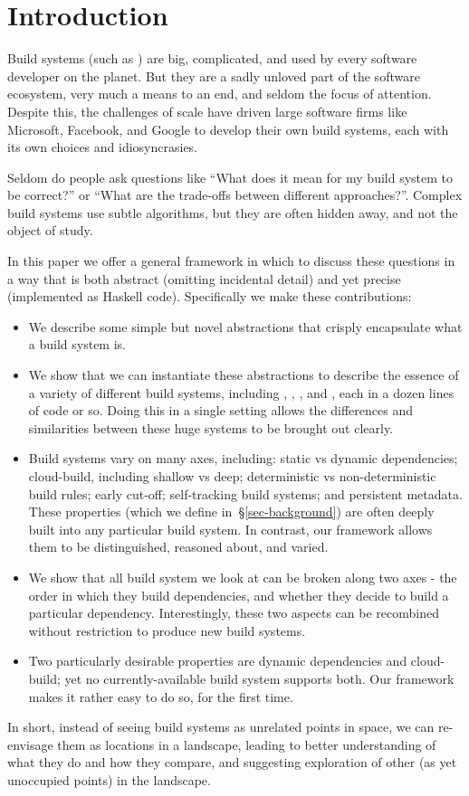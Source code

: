 \section{Introduction}\label{sec-intro}

Build systems (such as \Make) are big, complicated, and used by every
software developer on the planet.  But they are a sadly unloved part
of the software ecosystem, very much a means to an end, and seldom the
focus of attention.  Despite this, the challenges of scale have driven
large software firms like Microsoft, Facebook, and Google to develop
their own build systems, each with its own choices and idiosyncrasies.

Seldom do people ask questions like ``What does it mean for my build
system to be correct?'' or ``What are the trade-offs between different
approaches?''.  Complex build systems use subtle algorithms, but they
are often hidden away, and not the object of study.

In this paper we offer a general framework in which to discuss these
questions in a way that is both abstract (omitting incidental detail)
and yet precise (implemented as Haskell code).  Specifically we make
these contributions:
\begin{itemize}
\item We describe some simple but novel abstractions that
crisply encapsulate what a build system is.
\item We show that we can instantiate
these abstractions to describe the essence of a variety of different
build systems, including \Make, \Shake, \Bazel, and \Excel, each in
a dozen lines of code or so.
Doing this in a single setting allows
the differences and similarities between these huge systems to be
brought out clearly.
\item Build systems vary on many axes,
including: static vs dynamic dependencies; cloud-build, including
shallow vs deep; deterministic vs non-deterministic build rules;
early cut-off; self-tracking build systems; and persistent metadata.
These properties (which we define in~\S\ref{sec-background}) are often
deeply built into any particular build system.
In contrast, our framework allows them to be distinguished,
reasoned about, and varied.
\item We show that all build system we look at can be broken along two axes - the order in which they build dependencies, and whether they decide to build a particular dependency. Interestingly, these two aspects can be recombined without restriction to produce new build systems.
\item Two particularly desirable properties are dynamic dependencies
and cloud-build; yet no currently-available build system supports
both.  Our framework makes it rather easy to do so, for the first
time.
\end{itemize}
In short, instead of seeing build systems as unrelated
points in space, we can re-envisage them as locations in a landscape,
leading to better understanding of what they do and how they compare,
and suggesting exploration of other (as yet unoccupied points) in the
landscape.

